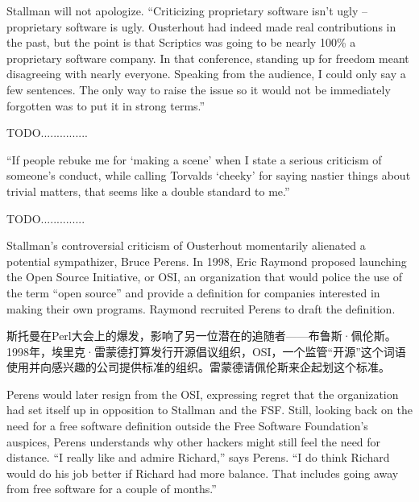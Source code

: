 \ifdefined\eng
Stallman will not apologize.  ``Criticizing proprietary software isn't ugly -- proprietary software is ugly.  Ousterhout had indeed made real contributions in the past, but the point is that Scriptics was going to be nearly 100\% a proprietary software company.  In that conference, standing up for freedom meant disagreeing with nearly everyone. Speaking from the audience, I could only say a few sentences.  The only way to raise the issue so it would not be immediately forgotten was to put it in strong terms.''
\fi

\ifdefined\chs
TODO...............
\fi

\ifdefined\eng
``If people rebuke me for `making a scene' when I state a serious criticism of someone's conduct, while calling Torvalds `cheeky' for saying nastier things about trivial matters, that seems like a double standard to me.''
\fi

\ifdefined\chs
TODO..............
\fi

\ifdefined\eng
Stallman's controversial criticism of Ousterhout momentarily alienated a potential sympathizer, Bruce Perens. In 1998, Eric Raymond proposed launching the Open Source Initiative, or OSI, an organization that would police the use of the term ``open source'' and provide a definition for companies interested in making their own programs. Raymond recruited Perens to draft the definition.
\fi

\ifdefined\chs
斯托曼在Perl大会上的爆发，影响了另一位潜在的追随者——布鲁斯·佩伦斯。1998年，埃里克·雷蒙德打算发行开源倡议组织，OSI，一个监管``开源''这个词语使用并向感兴趣的公司提供标准的组织。雷蒙德请佩伦斯来企起划这个标准。 
\fi

\ifdefined\eng
Perens would later resign from the OSI, expressing regret that the organization had set itself up in opposition to Stallman and the FSF. Still, looking back on the need for a free software definition outside the Free Software Foundation's auspices, Perens understands why other hackers might still feel the need for distance. ``I really like and admire Richard,'' says Perens. ``I do think Richard would do his job better if Richard had more balance. That includes going away from free software for a couple of months.''
\fi

